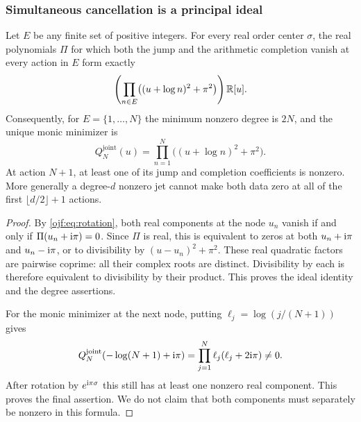 \subsubsection{Simultaneous cancellation is a principal ideal}

\begin{theorem}
\label{ojf:thm:joint}
Let $E$ be any finite set of positive integers. For every real order
center $\sigma$, the real polynomials $\Pi$ for which both the jump and
the arithmetic completion vanish at every action in $E$ form exactly
\begin{equation}\label{ojf:eq:joint-ideal}
 \left(\prod_{n\in E}\bigl((u+\log n)^2+\pi^2\bigr)\right)\mathbb R[u].
\end{equation}
Consequently, for $E=\{1,\ldots,N\}$ the minimum nonzero degree is $2N$,
and the unique monic minimizer is
\begin{equation}\label{ojf:eq:joint-extremizer}
 Q_N^{\mathrm{joint}}(u)=
       \prod_{n=1}^N\bigl((u+\log n)^2+\pi^2\bigr).
\end{equation}
At action $N+1$, at least one of its jump and completion coefficients
is nonzero. More generally a degree-$d$ nonzero jet cannot make both
data zero at all of the first $\lfloor d/2\rfloor+1$ actions.
\end{theorem}

\begin{proof}
By \eqref{ojf:eq:rotation}, both real components at the node $u_n$
vanish if and only if $\Pi(u_n+\mathrm{i}\pi)=0$. Since $\Pi$ is real,
this is equivalent to zeros at both $u_n+\mathrm{i}\pi$ and $u_n-\mathrm{i}\pi$,
or to divisibility by $(u-u_n)^2+\pi^2$. These real quadratic factors
are pairwise coprime: all their complex roots are distinct. Divisibility
by each is therefore equivalent to divisibility by their product.
This proves the ideal identity and the degree assertions.

For the monic minimizer at the next node, putting
$\ell_j=\log(j/(N+1))$ gives
\begin{equation}\label{ojf:eq:next-joint}
 Q_N^{\mathrm{joint}}(-\log(N+1)+\mathrm{i}\pi)
      =\prod_{j=1}^N\ell_j(\ell_j+2\mathrm{i}\pi)\ne0.
\end{equation}
After rotation by $e^{\mathrm{i}\pi\sigma}$ this still has at least one
nonzero real component. This proves the final assertion. We do not
claim that both components must separately be nonzero in this formula.
\end{proof}

